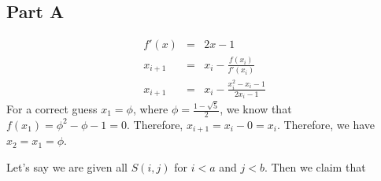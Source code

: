 \documentclass[12pt,twoside]{article}
\begin{document}

\begin{problems}

\section*{Part A}

\problem %
\begin{problemparts}

\problempart %
\begin{eqnarray*}
f'(x) &=& 2x - 1\\
x_{i+1} &=& x_i - \frac{f(x_i)}{f'(x_i)}\\
x_{i+1} &=& x_i - \frac{x_i^2 - x_i - 1}{2x_i - 1}
\end{eqnarray*}
\problempart  %
For a correct guess $x_1 = \phi$, where $\phi = \frac{1 - \sqrt{5}}{2}$, we know that $f(x_1) = \phi^2 - \phi - 1 = 0$. Therefore, $x_{i+1} = x_i - 0 = x_i$. Therefore, we have $x_2 = x_1 = \phi$.
\end{problemparts}

\problem %
\begin{problemparts}

\problempart %
Let's say we are given all $S(i,j)$ for $i < a$ and $j < b$. Then we claim that


\end{problemparts}
\end{problems}
\end{document}
